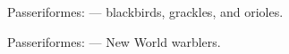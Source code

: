 \documentclass[t]{beamer}
\newcommand{\backoneline}{\vspace{-\baselineskip}}
\begin{document}
%

\begin{frame}{Passeriformes:  — blackbirds, grackles, and orioles.}
	
	
\end{frame}

%

\begin{frame}{Passeriformes:  — New World warblers.}
	
	
\end{frame}

%
\end{document}
